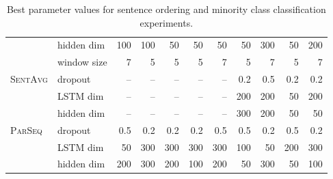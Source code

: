 \documentclass[11pt,a4paper]{article}
\newcommand \parseq{\textsc{ParSeq}\xspace}
\newcommand \sentavg{\textsc{SentAvg}\xspace}
\begin{document}
\begin{table*}[htb]
\begin{center}
\begin{footnotesize}
\begin{tabular}{llrrrrrrrrr}
        & hidden dim & 100 & 100 & 50 & 50 & 50 & 50 & 300 & 50 & 200 \\
        & window size &  7 & 5 & 5 & 5 & 7 & 5 & 7 & 5 & 7 \\
\midrule
\sentavg 	& dropout & -- & -- & -- & -- & -- & 0.2 & 0.5 & 0.2 & 0.2 \\
			& LSTM dim & -- & -- & -- & -- & -- & 200 & 200 & 50 & 200 \\
           	& hidden dim & -- & -- & -- & -- & -- & 300 & 200 & 50 & 50 \\
            \midrule
\parseq	& dropout & 0.5 & 0.2 & 0.2 & 0.2 & 0.5 & 0.5 & 0.2 & 0.5 & 0.2 \\
		& LSTM dim & 50 & 300 & 300 & 300 & 300 & 100 & 50 & 200 & 300 \\
        & hidden dim & 200 & 300 & 200 & 100 & 200 & 50 & 300 & 50 & 100 \\
\bottomrule
\end{tabular}
\end{footnotesize}
\caption{Best parameter values for sentence ordering and minority class classification experiments.}
\label{tab:param_vals2}
\end{center}
\end{table*} 
\end{document}
